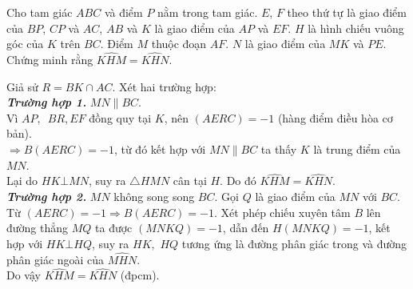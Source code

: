 \begin{bt}%
	Cho tam giác $ ABC $ và điểm $ P $ nằm trong tam giác. $ E $, $ F $ theo thứ tự là giao điểm của $ BP $, $ CP $ và $ AC $, $ AB $ và $ K $ là giao điểm của $ AP $ và $ EF $. $ H $ là hình chiếu vuông góc của $ K $ trên $ BC $. Điểm $ M$  thuộc đoạn $ AF $. $ N $ là giao điểm của $ MK $ và $ PE $. Chứng minh rằng $ \widehat{KHM} = \widehat{KHN} $.
	\loigiai
	{Giả sử $ R = BK \cap AC. $ Xét hai trường hợp:\\
		\textit{\textbf{Trường hợp 1.}}	$ MN \parallel BC. $\\
		Vì $ AP,\, $ $ BR $,\,$ EF $ đồng quy tại $ K $, nên $ (AERC) = -1$ (hàng điểm điều hòa cơ bản).\\ $ \Rightarrow B(AERC) = -1 $, từ đó kết hợp với $ MN \parallel BC $ ta thấy $ K $ là trung điểm của $ MN $.\\ Lại do $ HK \bot MN $, suy ra $ \triangle HMN $ cân tại $ H $. Do đó $ \widehat{KHM} = \widehat{KHN} $.\\
		\textit{\textbf{Trường hợp 2.}}	$ MN$ không song song $BC. $
		\immini
		{
			Gọi $ Q $ là giao điểm của $ MN $ với $ BC $.\\ Từ $ (AERC) = -1 \Rightarrow B(AERC) = -1$. Xét phép chiếu xuyên tâm $ B $ lên đường thẳng $ MQ $ ta được $ (MNKQ) = -1 $, dẫn đến $ H(MNKQ) = -1 $, kết hợp với $ HK \bot HQ $, suy ra $ HK, $ $ HQ $ tương ứng là đường phân giác trong và đường phân giác ngoài của $ \widehat{MHN} $.\\ Do vậy $ \widehat{KHM} = \widehat{KHN} $ (đpcm).
		}
		{
		}
	}
\end{bt}

